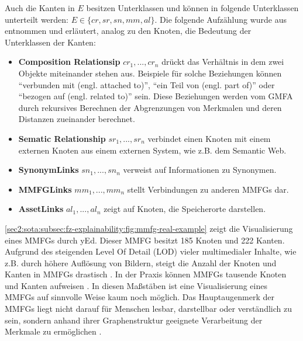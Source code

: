 Auch die Kanten in $E$ besitzen Unterklassen und können in folgende Unterklassen unterteilt werden: $E \in \{cr,sr,sn,mm,al\}$.
Die folgende Aufzählung wurde aus \cite{ai-based-sem-ind-retr-soc} entnommen und erläutert, analog zu den Knoten, die Bedeutung der Unterklassen der Kanten:
\begin{itemize}
    \item \textbf{Composition Relationsip} $cr_{1},...,cr_{n}$ drückt das Verhältnis in dem zwei Objekte miteinander stehen aus.
    Beispiele für solche Beziehungen können \enquote{verbunden mit (engl. attached to)}, \enquote{ein Teil von (engl. part of)} oder \enquote{bezogen auf (engl. related to)} sein.
    Diese Beziehungen werden vom GMFA durch rekursives Berechnen der Abgrenzungen von Merkmalen und deren Distanzen zueinander berechnet.
    \item \textbf{Sematic Relationship} $sr_{1},...,sr_{n}$ verbindet einen Knoten mit einem externen Knoten aus einem externen System, wie z.B. dem Semantic Web.
    \item \textbf{SynonymLinks} $sn_{1},...,sn_{n}$ verweist auf Informationen zu Synonymen.
    \item \textbf{MMFGLinks} $mm_{1},...,mm_{n}$ stellt Verbindungen zu anderen MMFGs dar.
    \item \textbf{AssetLinks} $al_{1},...,al_{n}$ zeigt auf Knoten, die Speicherorte darstellen.
\end{itemize}
\cref{sec2:sota:subsec:fz-explainability:fig:mmfg-real-example} zeigt die Visualisierung eines MMFGs durch yEd.
Dieser MMFG besitzt 185 Knoten und 222 Kanten.
Aufgrund des steigenden Level Of Detail (LOD) vieler multimedialer Inhalte, wie z.B. durch höhere Auflösung von Bildern, steigt die Anzahl der Knoten und Kanten in MMFGs drastisch \cite{ai-based-sem-ind-retr-soc}.
In der Praxis können MMFGs tausende Knoten und Kanten aufweisen \cite{jour-smmir}.
In diesen Maßstäben ist eine Visualisierung eines MMFGs auf sinnvolle Weise kaum noch möglich.
Das Hauptaugenmerk der MMFGs liegt nicht darauf für Menschen lesbar, darstellbar oder verständlich zu sein, sondern anhand ihrer Graphenstruktur geeignete Verarbeitung der Merkmale zu ermöglichen \cite{ai-based-sem-ind-retr-soc}.

